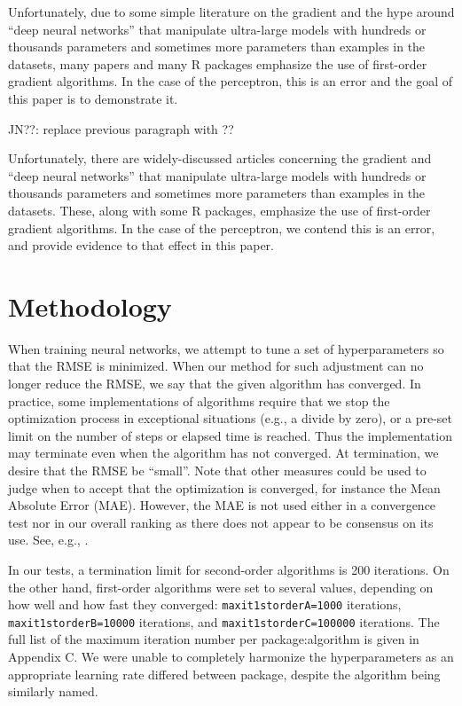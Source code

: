 Unfortunately, due to some simple literature on the gradient and the
hype around ``deep neural networks'' that manipulate ultra-large models
with hundreds or thousands parameters and sometimes more parameters than
examples in the datasets, many papers and many R packages emphasize the
use of first-order gradient algorithms. In the case of the perceptron,
this is an error and the goal of this paper is to demonstrate it.

JN??: replace previous paragraph with ??

Unfortunately, there are widely-discussed articles concerning the
gradient and ``deep neural networks'' that manipulate ultra-large models
with hundreds or thousands parameters and sometimes more parameters than
examples in the datasets. These, along with some R packages, emphasize
the use of first-order gradient algorithms. In the case of the
perceptron, we contend this is an error, and provide evidence to that
effect in this paper.

\hypertarget{methodology}{%
\section{Methodology}\label{methodology}}

When training neural networks, we attempt to tune a set of
hyperparameters so that the RMSE is minimized. When our method for such
adjustment can no longer reduce the RMSE, we say that the given
algorithm has converged. In practice, some implementations of algorithms
require that we stop the optimization process in exceptional situations
(e.g., a divide by zero), or a pre-set limit on the number of steps or
elapsed time is reached. Thus the implementation may terminate even when
the algorithm has not converged. At termination, we desire that the RMSE
be ``small''. Note that other measures could be used to judge when to
accept that the optimization is converged, for instance the Mean
Absolute Error (MAE). However, the MAE is not used either in a
convergence test nor in our overall ranking as there does not appear to
be consensus on its use. See, e.g.,
\citep{willmott2005advantages,chai2014root}.

In our tests, a termination limit for second-order algorithms is 200
iterations. On the other hand, first-order algorithms were set to
several values, depending on how well and how fast they converged:
\texttt{maxit1storderA=1000} iterations, \texttt{maxit1storderB=10000}
iterations, and \texttt{maxit1storderC=100000} iterations. The full list
of the maximum iteration number per package:algorithm is given in
Appendix C. We were unable to completely harmonize the hyperparameters
as an appropriate learning rate differed between package, despite the
algorithm being similarly named.

